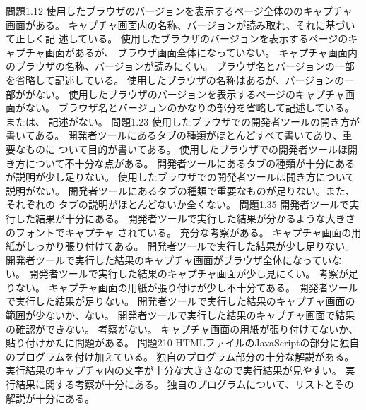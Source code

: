 {{問題1.1}{2}{
	{使用したブラウザのバージョンを表示するページ全体ののキャプチャ画面がある。}
  {キャプチャ画面内の名称、バージョンが読み取れ、それに基づいて正しく記
  述している。}
	}
	{
	{使用したブラウザのバージョンを表示するページのキャプチャ画面があるが、
  ブラウザ画面全体になっていない。}
  {キャプチャ画面内のブラウザの名称、バージョンが読みにくい。}
  {ブラウザ名とバージョンの一部を省略して記述している。}
	{使用したブラウザの名称はあるが、バージョンの一部ががない。}
	}
	{
	{使用したブラウザのバージョンを表示するページのキャプチャ画面がない。}
  {ブラウザ名とバージョンのかなりの部分を省略して記述している。または、
  記述がない。}
	}
  {問題1.2}{3}{
	{使用したブラウザでの開発者ツールの開き方が書いてある。}
  {開発者ツールにあるタブの種類がほとんどすべて書いてあり、重要なものに
  ついて目的が書いてある。}
  }
  {
	{使用したブラウザでの開発者ツールほ開き方について不十分な点がある。}
  {開発者ツールにあるタブの種類が十分にあるが説明が少し足りない。}
  }
  {
	{使用したブラウザでの開発者ツールほ開き方について説明がない。}
  {開発者ツールにあるタブの種類で重要なものが足りない。また、それぞれの
  タブの説明がほとんどないか全くない。}
  }
  {問題1.3}{5}{
  {開発者ツールで実行した結果が十分にある。}
  {開発者ツールで実行した結果が分かるような大きさのフォントでキャプチャ
  されている。}
  {充分な考察がある。}
  {キャプチャ画面の用紙がしっかり張り付けてある。}
  }
  {
  {開発者ツールで実行した結果が少し足りない。}
  {開発者ツールで実行した結果のキャプチャ画面がブラウザ全体になっていな
  い。}
  {開発者ツールで実行した結果のキャプチャ画面が少し見にくい。}
  {考察が足りない。}
  {キャプチャ画面の用紙が張り付けが少し不十分てある。}
  }
  {
  {開発者ツールで実行した結果が足りない。}
  {開発者ツールで実行した結果のキャプチャ画面の範囲が少ないか、ない。}
  {開発者ツールで実行した結果のキャプチャ画面で結果の確認ができない。}
  {考察がない。}
  {キャプチャ画面の用紙が張り付けてないか、貼り付けかたに問題がある。}
  }
	{問題2}{10}
	{
  {HTMLファイルのJavaScriptの部分に独自のプログラムを付け加えている。}
  {独自のプログラム部分の十分な解説がある。}
  {実行結果のキャプチャ内の文字が十分な大きさなので実行結果が見やすい。}
  {実行結果に関する考察が十分にある。}
  {独自のプログラムについて、リストとその解説が十分にある。}
}}
